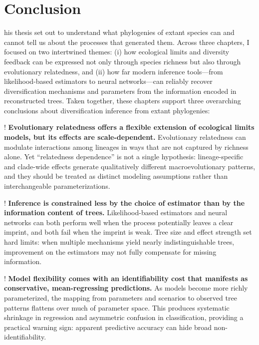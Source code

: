 \chapter{Conclusion}
\label{conclusion}

his thesis set out to understand what phylogenies of extant species can and cannot tell us about the processes that generated them. Across three chapters, I focused on two intertwined themes: (i) how ecological limits and diversity feedback can be expressed not only through species richness but also through evolutionary relatedness, and (ii) how far modern inference tools---from likelihood-based estimators to neural networks---can reliably recover diversification mechanisms and parameters from the information encoded in reconstructed trees. Taken together, these chapters support three overarching conclusions about diversification inference from extant phylogenies:

\begin{fancyenumerate}
    \item! \textbf{Evolutionary relatedness offers a flexible extension of ecological limits models, but its effects are scale-dependent.}
    Evolutionary relatedness can modulate interactions among lineages in ways that are not captured by richness alone. Yet ``relatedness dependence'' is not a single hypothesis: lineage-specific and clade-wide effects generate qualitatively different macroevolutionary patterns, and they should be treated as distinct modeling assumptions rather than interchangeable parameterizations.

    \item! \textbf{Inference is constrained less by the choice of estimator than by the information content of trees.}
    Likelihood-based estimators and neural networks can both perform well when the process potentially leaves a clear imprint, and both fail when the imprint is weak. Tree size and effect strength set hard limits: when multiple mechanisms yield nearly indistinguishable trees, improvement on the estimators may not fully compensate for missing information.

    \item! \textbf{Model flexibility comes with an identifiability cost that manifests as conservative, mean-regressing predictions.}
    As models become more richly parameterized, the mapping from parameters and scenarios to observed tree patterns flattens over much of parameter space. This produces systematic shrinkage in regression and asymmetric confusion in classification, providing a practical warning sign: apparent predictive accuracy can hide broad non-identifiability.
\end{fancyenumerate}
